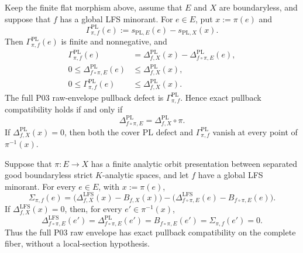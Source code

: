 \begin{theorem}
\label{thm:p031-finite-flat-pl-defect-balance}
Keep the finite flat morphism above, assume that $E$ and $X$ are
boundaryless, and suppose that $f$ has a global LFS minorant.  For
$e\in E$, put $x:=\pi(e)$ and
\[
 \Gamma^{\mathrm{PL}}_{\pi,f}(e)
   :=s_{\mathrm{PL},E}(e)-s_{\mathrm{PL},X}(x).
\]
Then $\Gamma^{\mathrm{PL}}_{\pi,f}(e)$ is finite and nonnegative, and
\begin{align}
 \Gamma^{\mathrm{PL}}_{\pi,f}(e)
   &=\Delta^{\mathrm{PL}}_{f,X}(x)
       -\Delta^{\mathrm{PL}}_{f\circ\pi,E}(e),
\label{eq:p031-finite-flat-pl-defect-balance}\\
 0\leq\Delta^{\mathrm{PL}}_{f\circ\pi,E}(e)
   &\leq\Delta^{\mathrm{PL}}_{f,X}(x),
\label{eq:p031-finite-flat-pl-defect-contraction}\\
 0\leq\Gamma^{\mathrm{PL}}_{\pi,f}(e)
   &\leq\Delta^{\mathrm{PL}}_{f,X}(x).
\label{eq:p031-finite-flat-pl-gain-bound}
\end{align}
The full P03 raw-envelope pullback defect is
$\Gamma^{\mathrm{PL}}_{\pi,f}$.  Hence exact pullback compatibility holds
if and only if
\begin{equation}
\label{eq:p031-finite-flat-pl-defect-preservation}
 \Delta^{\mathrm{PL}}_{f\circ\pi,E}
     =\Delta^{\mathrm{PL}}_{f,X}\circ\pi.
\end{equation}
If $\Delta^{\mathrm{PL}}_{f,X}(x)=0$, then both the cover PL defect and
$\Gamma^{\mathrm{PL}}_{\pi,f}$ vanish at every point of $\pi^{-1}(x)$.
\end{theorem}

\begin{corollary}
\label{cor:p031-finite-orbit-four-defect-balance}
Suppose that $\pi:E\to X$ has a finite analytic orbit presentation between
separated good boundaryless strict $K$-analytic spaces, and let $f$ have a
global LFS minorant.  For every $e\in E$, with $x:=\pi(e)$,
\begin{equation}
\label{eq:p031-finite-orbit-four-defect-balance}
 \Sigma_{\pi,f}(e)
  =\bigl(\Delta^{\mathrm{LFS}}_{f,X}(x)-B_{f,X}(x)\bigr)
   -\bigl(
      \Delta^{\mathrm{LFS}}_{f\circ\pi,E}(e)
        -B_{f\circ\pi,E}(e)
    \bigr).
\end{equation}
If $\Delta^{\mathrm{LFS}}_{f,X}(x)=0$, then, for every
$e'\in\pi^{-1}(x)$,
\[
 \Delta^{\mathrm{LFS}}_{f\circ\pi,E}(e')
  =\Delta^{\mathrm{PL}}_{f\circ\pi,E}(e')
  =B_{f\circ\pi,E}(e')
  =\Sigma_{\pi,f}(e')=0.
\]
Thus the full P03 raw envelope has exact pullback compatibility on the
complete fiber, without a local-section hypothesis.
\end{corollary}
